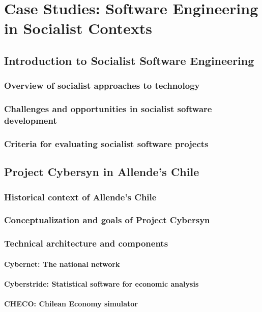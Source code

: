 \chapter{Case Studies: Software Engineering in Socialist Contexts}

\section{Introduction to Socialist Software Engineering}
\subsection{Overview of socialist approaches to technology}
\subsection{Challenges and opportunities in socialist software development}
\subsection{Criteria for evaluating socialist software projects}

\newpage

\section{Project Cybersyn in Allende's Chile}
\subsection{Historical context of Allende's Chile}
\subsection{Conceptualization and goals of Project Cybersyn}
\subsection{Technical architecture and components}
\subsubsection{Cybernet: The national network}
\subsubsection{Cyberstride: Statistical software for economic analysis}
\subsubsection{CHECO: Chilean Economy simulator}
